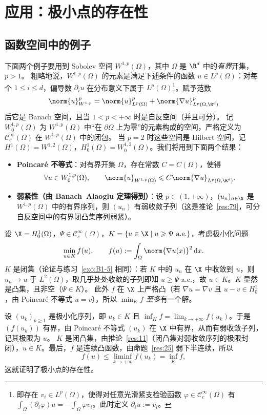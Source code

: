 \section{应用：极小点的存在性}

\subsection*{函数空间中的例子}

下面两个例子要用到 Sobolev 空间 $W^{1,p}(\Omega)$，其中 $\Omega$ 是 $\R^d$ 中的\emph{有界}开集，$p>1$。
粗略地说，$W^{1,p}(\Omega)$ 的元素是满足下述条件的函数 $u\in L^p(\Omega)$：对每个 $1\leqslant i\leqslant d$，偏导数 $\partial_iu$ 在分布意义下属于 $L^p(\Omega)$\footnote{即存在 $v_i\in L^p(\Omega)$，使得对任意光滑紧支检验函数 $\varphi\in\mathcal{C}_c^\infty(\Omega)$ 有 $\int_\Omega(\partial_i\varphi)u=-\int_\Omega\varphi v_i$。此时定义 $\partial_iu:=v_i$。}。赋予范数
\[
  \norm{u}_{W^{1,p}}^p=\norm{u}_{L^p(\Omega)}^p+\norm{\nabla u}_{L^p(\Omega,\R^d)}^p
\]
后它是 Banach 空间，且当 $1<p<+\infty$ 时是自反空间（并且可分）。
记 $W_0^{1,p}(\Omega)$ 为 $W^{1,p}(\Omega)$ 中“在 $\partial\Omega$ 上为零”的元素构成的空间，严格定义为 $\mathcal{C}_c^\infty(\Omega)$ 在 $W^{1,p}(\Omega)$ 中的闭包。
当 $p=2$ 时这些空间是 Hilbert 空间，记 $H^1(\Omega)=W^{1,2}(\Omega)$，$H_0^1(\Omega)=W_0^{1,2}(\Omega)$。我们将用到下面两个结果：
\begin{itemize}
  \item \textbf{Poincaré 不等式}：对有界开集 $\Omega$，存在常数 $C=C(\Omega)$，使得
  \[
    \forall u\in W_0^{1,p}(\Omega),\qquad \norm{u}_{W^{1,p}(\Omega)}\leqslant C\norm{\nabla u}_{L^p(\Omega,\R^d)} .
  \]
  \item \textbf{弱紧性（由 Banach--Alaoglu 定理得到）}：设 $p\in(1,+\infty)$，$(u_n)_{n\in\N}$ 是 $W^{1,p}(\Omega)$ 中的有界序列，则 $(u_n)$ 有弱收敛子列（这是推论~\ref{res:79}，可分自反空间中的有界闭凸集序列弱紧）。
\end{itemize}

\begin{example}
\label{exa:11}
设 $\X=H_0^1(\Omega)$，$\Psi\in\mathcal{C}_c^\infty(\Omega)$，$K=\{u\in\X \mid u\geqslant\Psi\ \text{a.e.}\}$，考虑极小化问题
\[
  \min_{u\in K}f(u),\qquad f(u):=\int_\Omega\norm{\nabla u(x)}^2\,\mathrm{d}x .
\]
$K$ 是闭集（论证与练习~\ref{exo:B1-5} 相同）：若 $K$ 中的 $u_n$ 在 $\X$ 中收敛到 $u$，则 $u_n\to u$ 于 $L^2(\Omega)$，取几乎处处收敛的子列即知 $u\geqslant\Psi$ a.e.，故 $u\in K$。$K$ 显然是凸集，且非空（$\Psi\in K$）。
此外 $f$ 在 $\X$ 上严格凸（若 $\nabla u=\nabla v$ 且 $u-v\in H_0^1$，由 Poincaré 不等式 $u=v$），所以 $\min_Kf$ \emph{至多}有一个解。

设 $(u_k)_{k\geqslant1}$ 是极小化序列，即 $u_k\in K$ 且 $\inf_Kf=\lim_{k\to+\infty}f(u_k)$。于是 $(f(u_k))$ 有界，由 Poincaré 不等式 $(u_k)$ 在 $\X$ 中有界，从而有弱收敛子列，记其极限为 $u$。
$K$ 是闭凸集，由推论~\ref{res:11}（闭凸集对弱收敛序列的极限封闭），$u\in K$。最后，$f$ 是连续凸函数，由命题~\ref{res:25} 弱下半连续，所以
\[
  f(u)\leqslant\liminf_{k\to+\infty}f(u_k)=\inf_Kf ,
\]
这就证明了极小点的存在性。
\end{example}

